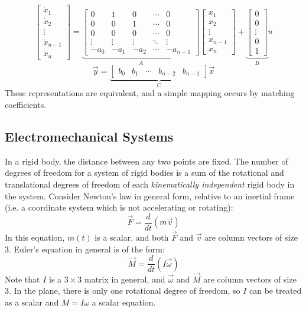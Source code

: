 \[\begin{bmatrix}
    \dot x_1\\
    \dot x_2\\
    \vdots\\
    \dot x_{n-1}\\
    \dot x_n
\end{bmatrix} = \underbrace{\begin{bmatrix}
    0 & 1 & 0 & \cdots & 0\\
    0 & 0 & 1 & \cdots & 0\\
    0 & 0 & 0 & \cdots & 0\\
    \vdots & \vdots & \vdots & \ddots & \vdots\\
    -a_0 & -a_1 & -a_2 & \cdots & -a_{n-1}    
\end{bmatrix}}_A\begin{bmatrix}
    x_1\\
    x_2\\
    \vdots\\
    x_{n-1}\\
    x_n
\end{bmatrix} + \underbrace{\begin{bmatrix}
    0\\
    0\\
    \vdots\\
    0\\
    1
\end{bmatrix}}_B u\] \[\vec{y} = \underbrace{\begin{bmatrix}
    b_0 & b_1 & \cdots & b_{n-2} & b_{n-1}
\end{bmatrix}}_C \vec{x}\] These representations are equivalent, and a simple mapping occurs by matching coefficients.

\subsection{Electromechanical Systems}

In a rigid body, the distance between any two points are fixed. The number of degrees of freedom for a system of rigid bodies is a sum of the rotational and translational degrees of freedom of each \textit{kinematically independent} rigid body in the system. Consider Newton's law in general form, relative to an inertial frame (i.e. a coordinate system which is not accelerating or rotating): \[\vec{F} = \frac{d}{dt}(m\vec{v})\] In this equation, $m(t)$ is a scalar, and both $\vec{F}$ and $\vec{v}$ are column vectors of size $3$. Euler's equation in general is of the form: \[\vec{M} =\frac{d}{dt}(I\vec{\omega})\] Note that $I$ is a $3\times 3$ matrix in general, and $\vec{\omega}$ and $\vec{M}$ are column vectors of size $3$. In the plane, there is only one rotational degree of freedom, so $I$ can be treated as a scalar and $M=I\omega$ a scalar equation.

